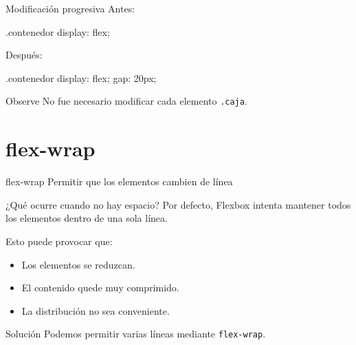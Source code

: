 \documentclass[aspectratio=169,11.5pt]{beamer}
\begin{document}
    \begin{frame}[fragile]{Modificación progresiva}
        Antes:

        \begin{csscodedark}
            .contenedor {
                display: flex;
            }
        \end{csscodedark}

        Después:

        \begin{csscodedark}
            .contenedor {
                display: flex;
                gap: 20px;
            }
        \end{csscodedark}

        \begin{block}{Observe}
            No fue necesario modificar cada
            elemento \texttt{.caja}.
        \end{block}
    \end{frame}



    \section{flex-wrap}

    \SectionSlide
    {flex-wrap}
    {Permitir que los elementos cambien de línea}

    \begin{frame}{¿Qué ocurre cuando no hay espacio?}
        Por defecto, Flexbox intenta mantener
        todos los elementos dentro de una sola línea.

        Esto puede provocar que:

        \begin{itemize}
            \item Los elementos se reduzcan.
            \item El contenido quede muy comprimido.
            \item La distribución no sea conveniente.
        \end{itemize}

        \begin{block}{Solución}
            Podemos permitir varias líneas
            mediante \texttt{flex-wrap}.
        \end{block}
    \end{frame}
\end{document}
